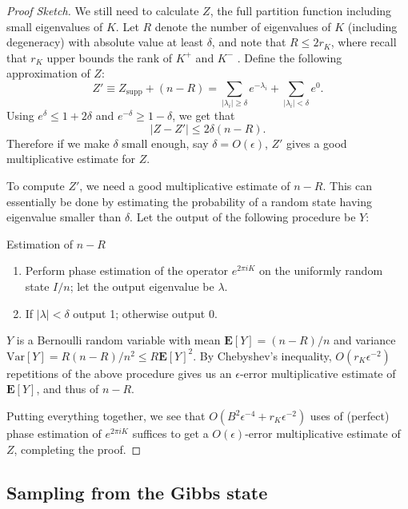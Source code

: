 \documentclass[a4paper,UKenglish,cleveref, autoref]{lipics-v2019}
\theoremstyle{remark}
\numberwithin{equation}{section}
\numberwithin{oracle}{section}
\numberwithin{remark}{section}
\newcommand{\E}{\mathbf{E}}
\begin{document}
\begin{proof}[Proof Sketch]
We still need to calculate $Z$, the full partition function including small eigenvalues of $K$. Let $R$ denote the number of eigenvalues of $K$ (including degeneracy) with absolute value at least $\delta$, and note that $R \le 2r_{K}$, where recall that $r_{K}$ upper bounds the rank of $K^+$ and $K^-$ . Define the following approximation of $Z$:
\begin{equation}
Z' \equiv Z_{\text{supp}} + (n-R) = \sum_{|\lambda_i| \ge \delta} e^{-\lambda_i} + \sum_{|\lambda_i| < \delta} e^{0}.
\end{equation}
Using $e^\delta \le 1+2\delta$ and $e^{-\delta} \ge 1-\delta$, we get that
\begin{equation}
| Z - Z' | \le 2\delta(n-R).
\end{equation}
Therefore if we make $\delta$ small enough,  say $\delta = O(\epsilon)$, $Z'$ gives a good multiplicative estimate for $Z$.

To compute $Z'$, we need a good multiplicative estimate of $n-R$. This can essentially be done by estimating the probability of a random state having eigenvalue smaller than $\delta$. Let the output of the following procedure be $Y$:

\begin{algorithm}[H]
\caption{Estimation of $n-R$}
 \label{algo:n-R}
\begin{enumerate}
\item Perform phase estimation of the operator $e^{2\pi iK}$ on the uniformly random state $I/n$; let the output eigenvalue be $\lambda$.
\item If $|\lambda| < \delta$ output 1; otherwise output 0.
\end{enumerate}
\end{algorithm}
$Y$ is a Bernoulli random variable with mean $\E[Y] = (n-R)/n$ and variance $\text{Var}[Y] = R (n-R) / n^2 \leq R \E[Y]^2$. By Chebyshev's inequality, $O(r_{K} \epsilon^{-2})$ repetitions of the above procedure gives us an $\epsilon$-error multiplicative estimate of $\E[Y]$, and thus of $n-R$.

Putting everything together, we see that  $O(B^2\epsilon^{-4} + r_{K}\epsilon^{-2})$ uses of (perfect) phase estimation   of $e^{2\pi iK}$ suffices to get a $O(\epsilon)$-error multiplicative estimate of $Z$, completing the proof.
\end{proof}

\subsection{Sampling from the Gibbs state}\label{append:low-rank-Gibbs}
\end{document}
